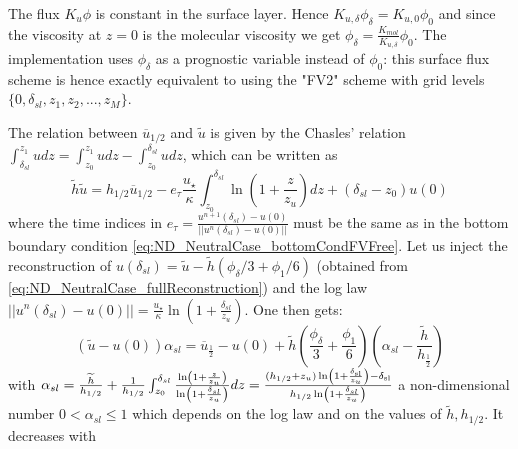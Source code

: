 \begin{remark}
	The flux $K_u \phi$ is constant in the surface layer. Hence
	$K_{u,\delta}\phi_{\delta} = K_{u,0} \phi_0$ and since the
	viscosity at $z=0$ is the molecular viscosity we get
	$\phi_{\delta} = \frac{K_{mol}}{K_{u,\delta}} \phi_0$.
	The implementation uses $\phi_{\delta}$ as a prognostic
	variable instead of $\phi_0$:
	this surface flux scheme is hence exactly equivalent
	to using the "FV2" scheme with grid levels
	$\{0, \delta_{sl}, z_1, z_2, ..., z_M\}$.
\end{remark}
\par
The relation between $\overline{u}_{1/2}$ and $\widetilde{u}$ is 
given by the Chasles' relation
$ \int_{\delta_{sl}}^{z_1} u dz = \int_{z_0}^{z_1} u dz -
\int_{z_0}^{\delta_{sl}} u dz$, which can be written as
\begin{equation}
\label{eq:ND_NeutralCase_Chasles}
	\widetilde{h}\widetilde{u} = h_{1/2}\overline{u}_{1/2} -
	e_\tau \frac{{u_\star}}{\kappa}\int_{z_0}^{\delta_{sl}}
	\ln(1+\frac{z}{z_{u}}) dz
	+ (\delta_{sl}-z_0) u(0)
\end{equation}
where the time indices in $e_\tau = \frac{u^{n+1}(\delta_{sl})-u(0)}
{||u^n(\delta_{sl})-u(0)||}$ must be the same as in the
bottom boundary condition
\eqref{eq:ND_NeutralCase_bottomCondFVFree}.
Let us inject the reconstruction of
$u(\delta_{sl}) = \widetilde{u} - \widetilde{h}(\phi_{\delta}/3 + \phi_1/6)$
(obtained from \eqref{eq:ND_NeutralCase_fullReconstruction})
and the log law $||u^n(\delta_{sl})-u(0)|| = \frac{{u_\star}}{\kappa}\ln(1+\frac{\delta_{sl}}{z_{u}})$. One then gets:
\begin{equation}
	\label{eq:ND_NeutralCase_utildeExpression}
	\left(\widetilde{u} - u(0)\right) \alpha_{sl} =
	\overline{u}_{\frac{1}{2}} - u(0) + \widetilde{h}\left(
	\frac{\phi_\delta}{3} + \frac{\phi_1}{6} \right)
	\left(\alpha_{sl} - \frac{\widetilde{h}}{h_{\frac{1}{2}}}\right)
\end{equation}
with $\alpha_{sl} =
\frac{\widetilde{h}}{{h_{1/2}}} + \frac{1}{{h_{1/2}}}\int_{z_0}^{\delta_{sl}}
\frac{\ln(1+\frac{z}{z_{u}})}{\ln(1+\frac{\delta_{sl}}{z_{u}})}dz
= \frac{(h_{1/2} + z_{u})
\ln(1+\frac{\delta_{\rm sl}}{z_{u}}) - \delta_{\rm sl}}{
	h_{1/2}\ln(1+\frac{\delta_{sl}}{z_{u}})}$ a non-dimensional
number $0 < \alpha_{sl} \leq 1$ which depends on the log law and
on the values of $\widetilde{h}, h_{1/2}$. It decreases with
